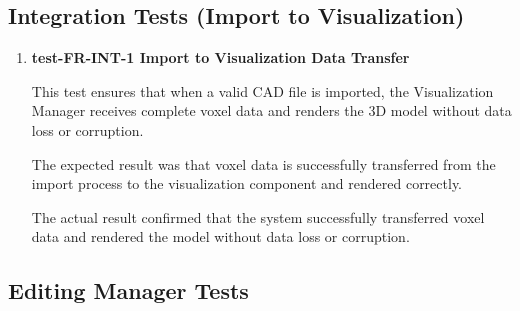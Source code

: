 \documentclass[12pt, titlepage]{article}
\begin{document}
\subsection{Integration Tests (Import to Visualization)}

\begin{enumerate}


\item \textbf{test-FR-INT-1 Import to Visualization Data Transfer}

\hspace{1.5em} This test ensures that when a valid CAD file is imported, the Visualization Manager receives complete voxel data and renders the 3D model without data loss or corruption.

The expected result was that voxel data is successfully transferred from the import process to the visualization component and rendered correctly.

The actual result confirmed that the system successfully transferred voxel data and rendered the model without data loss or corruption.
\end{enumerate}

\subsection{Editing Manager Tests}
\end{document}
